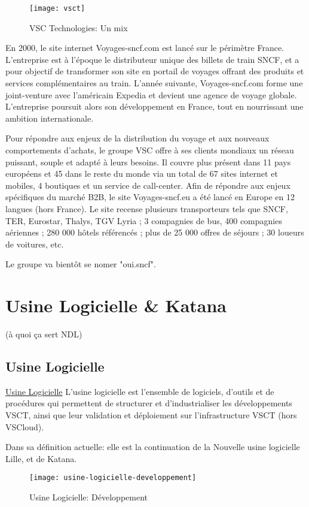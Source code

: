 \begin{figure}[ht]
\centering
\texttt{[image: vsct]}
\caption{VSC Technologies: Un mix}
\label{fig:vsct}
\end{figure}

En 2000, le site internet Voyages-sncf.com est lancé sur le périmètre France. L’entreprise est à l’époque le distributeur unique des billets de train SNCF, et a pour objectif de transformer son site en portail de voyages offrant des produits et services complémentaires au train. L’année suivante, Voyages-sncf.com forme une joint-venture avec l’américain Expedia et devient une agence de voyage globale. L’entreprise poursuit alors son développement en France, tout en nourrissant une ambition internationale.

Pour répondre aux enjeux de la distribution du voyage et aux nouveaux comportements d’achats, le groupe VSC offre à ses clients mondiaux un réseau puissant, souple et adapté à leurs besoins. Il couvre plus présent dans 11 pays européens et 45 dans le reste du monde via un total de 67 sites internet et mobiles, 4 boutiques et un service de call-center. Afin de répondre aux enjeux spécifiques du marché B2B, le site Voyages-sncf.eu a été lancé en Europe en 12 langues (hors France).
Le site recense plusieurs transporteurs tels que SNCF, TER, Eurostar, Thalys, TGV Lyria ; 3 compagnies de bus, 400 compagnies aériennes ; 280 000 hôtels référencés ; plus de 25 000 offres de séjours ; 30 loueurs de voitures, etc.

Le groupe va bientôt se nomer "oui.sncf".
\clearpage

\section{Usine Logicielle \& Katana} (à quoi ça sert NDL)
\subsection{Usine Logicielle}
\href{https://wiki.vsct.fr/pages/viewpage.action?spaceKey=KTN\&title=Usine+Logicielle+VSCT}{Usine Logicielle}
L'usine logicielle est l'ensemble de logiciels, d'outils et de procédures qui permettent de structurer et d'industrialiser les développements VSCT, ainsi que leur validation et déploiement sur l'infrastructure VSCT (hors VSCloud).

Dans sa définition actuelle: elle est la continuation de la Nouvelle usine logicielle Lille, et de Katana.

\begin{figure}[h]
\centering
\texttt{[image: usine-logicielle-developpement]}
\caption{Usine Logicielle: Développement}
\end{figure}

